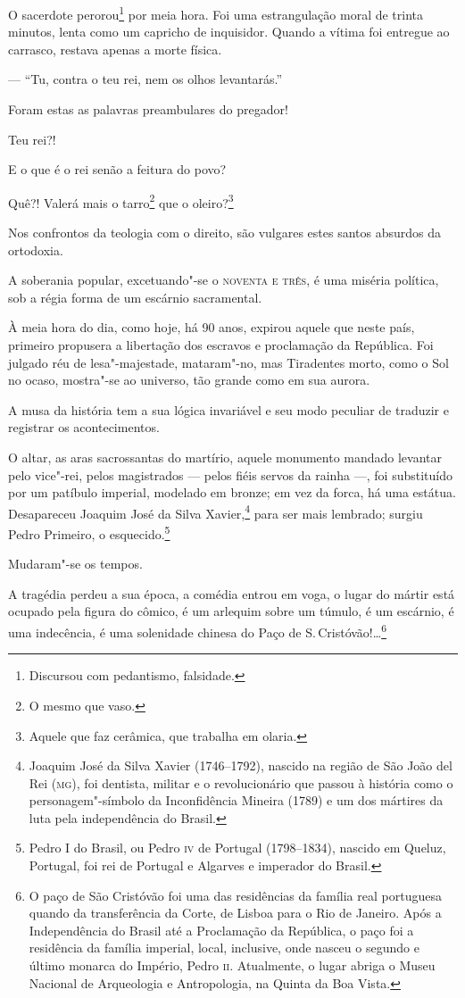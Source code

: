 O sacerdote perorou\footnote{Discursou com pedantismo, falsidade.} por
meia hora. Foi uma estrangulação moral de trinta minutos, lenta como um
capricho de inquisidor. Quando a vítima foi entregue ao carrasco,
restava apenas a morte física.

--- ``Tu, contra o teu rei, nem os olhos levantarás.''

Foram estas as palavras preambulares do pregador!

Teu rei?!

E o que é o rei senão a feitura do povo?

Quê?! Valerá mais o tarro\footnote{O mesmo que vaso.} que o
oleiro?\footnote{Aquele que faz cerâmica, que trabalha em olaria.}

Nos confrontos da teologia com o direito, são vulgares estes santos
absurdos da ortodoxia.

A soberania popular, excetuando"-se o \textsc{noventa e três}, é uma miséria
política, sob a régia forma de um escárnio sacramental.

\noindent\dotfill{}

À meia hora do dia, como hoje, há 90 anos, expirou aquele que neste
país, primeiro propusera a libertação dos escravos e proclamação da
República. Foi julgado réu de lesa"-majestade, mataram"-no, mas Tiradentes
morto, como o Sol no ocaso, mostra"-se ao universo, tão grande como em
sua aurora.

\noindent\dotfill{}

A musa da história tem a sua lógica invariável e seu modo peculiar de
traduzir e registrar os acontecimentos.

O altar, as aras sacrossantas do martírio, aquele monumento mandado
levantar pelo vice"-rei, pelos magistrados --- pelos fiéis servos da
rainha ---, foi substituído por um patíbulo imperial, modelado em
bronze; em vez da forca, há uma estátua. Desapareceu Joaquim José da
Silva Xavier,\footnote{Joaquim José da Silva Xavier (1746--1792),
  nascido na região de São João del Rei (\textsc{mg}), foi dentista, militar e o
  revolucionário que passou à história como o personagem"-símbolo da
  Inconfidência Mineira (1789) e um dos mártires da luta pela
  independência do Brasil.} para ser mais lembrado; surgiu Pedro
Primeiro, o esquecido.\footnote{Pedro I do Brasil, ou Pedro \textsc{iv} de
  Portugal (1798--1834), nascido em Queluz, Portugal, foi rei de Portugal
  e Algarves e imperador do Brasil.}

Mudaram"-se os tempos.

A tragédia perdeu a sua época, a comédia entrou em voga, o lugar do
mártir está ocupado pela figura do cômico, é um arlequim sobre um
túmulo, é um escárnio, é uma indecência, é uma solenidade chinesa do
Paço de S.\,Cristóvão!\ldots{}\footnote{O paço de São Cristóvão foi uma das
  residências da família real portuguesa quando da transferência da
  Corte, de Lisboa para o Rio de Janeiro. Após a Independência do Brasil
  até a Proclamação da República, o paço foi a residência da família
  imperial, local, inclusive, onde nasceu o segundo e último monarca do
  Império, Pedro \textsc{ii}. Atualmente, o lugar abriga o Museu Nacional de
  Arqueologia e Antropologia, na Quinta da Boa Vista.}

